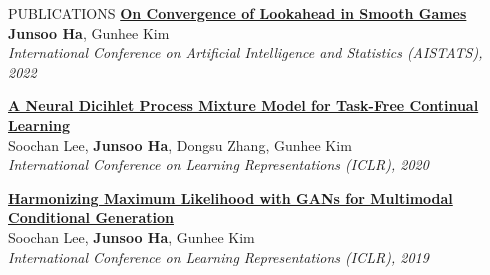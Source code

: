 \documentclass{resume} %
\begin{document}
\begin{rSection}{PUBLICATIONS}
	{\bf \href{https://proceedings.mlr.press/v151/ha22a.html}{On Convergence of Lookahead in Smooth Games}} \\
	{\bf Junsoo Ha}, Gunhee Kim \\
	{\em International Conference on Artificial Intelligence and Statistics (AISTATS), 2022}
	
	{\bf \href{https://openreview.net/forum?id=SJxSOJStPr}{A Neural Dicihlet Process Mixture Model for Task-Free Continual Learning}} \\ 
	Soochan Lee, {\bf Junsoo Ha}, Dongsu Zhang, Gunhee Kim \\
	{\em International Conference on Learning Representations (ICLR), 2020}
	
	
	{\bf \href{https://openreview.net/forum?id=HJxyAjRcFX}{Harmonizing Maximum Likelihood with GANs for Multimodal Conditional Generation}} \\ 
	Soochan Lee, {\bf Junsoo Ha}, Gunhee Kim \\
	{\em International Conference on Learning Representations (ICLR), 2019}
\end{rSection}

\end{document}
